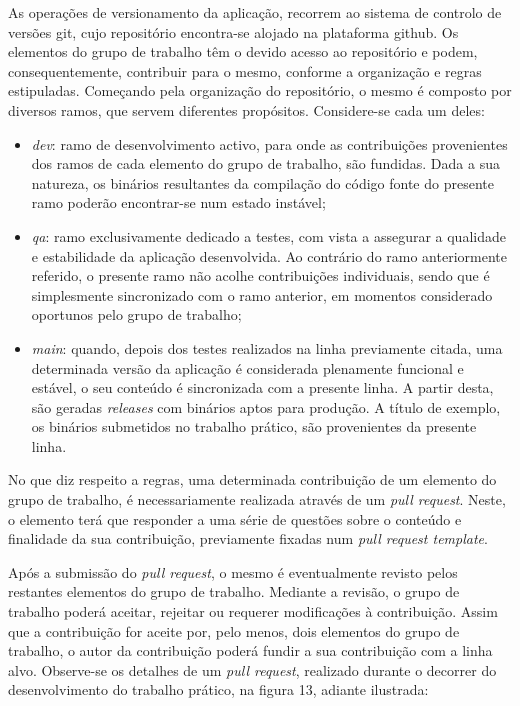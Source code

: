 \documentclass[12pt]{report}
\begin{document}
As operações de versionamento da aplicação, recorrem ao sistema de controlo de versões \gls{git}, cujo repositório encontra-se alojado na plataforma \gls{github}. Os elementos do grupo de trabalho têm o devido acesso ao repositório e podem, consequentemente, contribuir para o mesmo, conforme a organização e regras estipuladas. Começando pela organização do repositório, o mesmo é composto por diversos ramos, que servem diferentes propósitos. Considere-se cada um deles:

\begin{itemize}
    \item \emph{dev}: ramo de desenvolvimento activo, para onde as contribuições provenientes dos ramos de cada elemento do grupo de trabalho, são fundidas. Dada a sua natureza, os binários resultantes da compilação do código fonte do presente ramo poderão encontrar-se num estado instável;
    
    \item \emph{qa}: ramo exclusivamente dedicado a testes, com vista a assegurar a qualidade e estabilidade da aplicação desenvolvida. Ao contrário do ramo anteriormente referido, o presente ramo não acolhe contribuições individuais, sendo que é simplesmente sincronizado com o ramo anterior, em momentos considerado oportunos pelo grupo de trabalho;
    
    \item \emph{main}: quando, depois dos testes realizados na linha previamente citada, uma determinada versão da aplicação é considerada plenamente funcional e estável, o seu conteúdo é sincronizada com a presente linha. A partir desta, são geradas \textit{releases} com binários aptos para produção. A título de exemplo, os binários submetidos no trabalho prático, são provenientes da presente linha.
\end{itemize}

No que diz respeito a regras, uma determinada contribuição de um elemento do grupo de trabalho, é necessariamente realizada através de um \textit{pull request}. Neste, o elemento terá que responder a uma série de questões sobre o conteúdo e finalidade da sua contribuição, previamente fixadas num \textit{pull request template}. 

Após a submissão do \textit{pull request}, o mesmo é eventualmente revisto pelos restantes elementos do grupo de trabalho. Mediante a revisão, o grupo de trabalho poderá aceitar, rejeitar ou requerer modificações à contribuição. Assim que a contribuição for aceite por, pelo menos, dois elementos do grupo de trabalho, o autor da contribuição poderá fundir a sua contribuição com a linha alvo. Observe-se os detalhes de um \textit{pull request}, realizado durante o decorrer do desenvolvimento do trabalho prático, na figura 13, adiante ilustrada:
\end{document}
